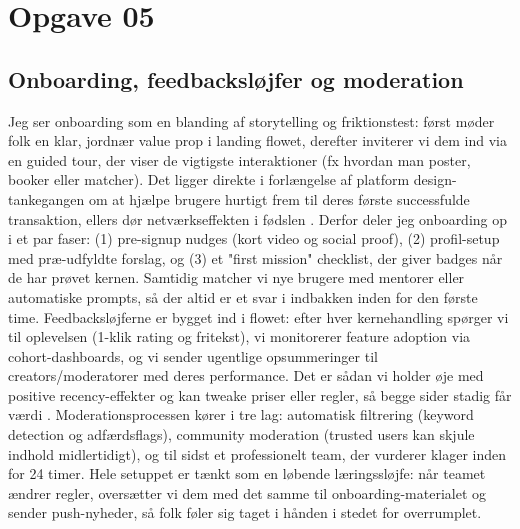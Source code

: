 \section*{Opgave 05}

\subsection*{Onboarding, feedbacksløjfer og moderation}
Jeg ser onboarding som en blanding af storytelling og friktionstest: først møder folk en klar, jordnær value prop i landing flowet, derefter inviterer vi dem ind via en guided tour, der viser de vigtigste interaktioner (fx hvordan man poster, booker eller matcher). Det ligger direkte i forlængelse af platform design-tankegangen om at hjælpe brugere hurtigt frem til deres første successfulde transaktion, ellers dør netværkseffekten i fødslen \citet{Choudary2016}. Derfor deler jeg onboarding op i et par faser: (1) pre-signup nudges (kort video og social proof), (2) profil-setup med præ-udfyldte forslag, og (3) et "first mission" checklist, der giver badges når de har prøvet kernen. Samtidig matcher vi nye brugere med mentorer eller automatiske prompts, så der altid er et svar i indbakken inden for den første time. Feedbacksløjferne er bygget ind i flowet: efter hver kernehandling spørger vi til oplevelsen (1-klik rating og fritekst), vi monitorerer feature adoption via cohort-dashboards, og vi sender ugentlige opsummeringer til creators/moderatorer med deres performance. Det er sådan vi holder øje med positive recency-effekter og kan tweake priser eller regler, så begge sider stadig får værdi \citet{Reillier2017}. Moderationsprocessen kører i tre lag: automatisk filtrering (keyword detection og adfærdsflags), community moderation (trusted users kan skjule indhold midlertidigt), og til sidst et professionelt team, der vurderer klager inden for 24 timer. Hele setuppet er tænkt som en løbende læringssløjfe: når teamet ændrer regler, oversætter vi dem med det samme til onboarding-materialet og sender push-nyheder, så folk føler sig taget i hånden i stedet for overrumplet.

